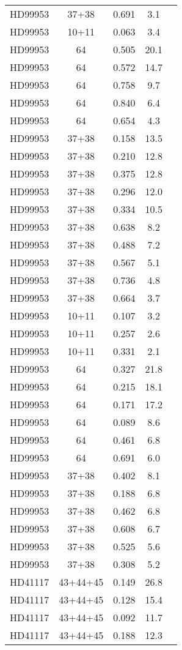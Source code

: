 \begin{table*}
\begin{tabular}{l c c c c}
HD99953 & 37+38 & 0.691 & 3.1\\ 
HD99953 & 10+11 & 0.063 & 3.4\\ 
HD99953 & 64 & 0.505 & 20.1\\ 
HD99953 & 64 & 0.572 & 14.7\\ 
HD99953 & 64 & 0.758 & 9.7\\ 
HD99953 & 64 & 0.840 & 6.4\\ 
HD99953 & 64 & 0.654 & 4.3\\ 
HD99953 & 37+38 & 0.158 & 13.5\\ 
HD99953 & 37+38 & 0.210 & 12.8\\ 
HD99953 & 37+38 & 0.375 & 12.8\\ 
HD99953 & 37+38 & 0.296 & 12.0\\ 
HD99953 & 37+38 & 0.334 & 10.5\\ 
HD99953 & 37+38 & 0.638 & 8.2\\ 
HD99953 & 37+38 & 0.488 & 7.2\\ 
HD99953 & 37+38 & 0.567 & 5.1\\ 
HD99953 & 37+38 & 0.736 & 4.8\\ 
HD99953 & 37+38 & 0.664 & 3.7\\ 
HD99953 & 10+11 & 0.107 & 3.2\\ 
HD99953 & 10+11 & 0.257 & 2.6\\ 
HD99953 & 10+11 & 0.331 & 2.1\\ 
HD99953 & 64 & 0.327 & 21.8\\ 
HD99953 & 64 & 0.215 & 18.1\\ 
HD99953 & 64 & 0.171 & 17.2\\ 
HD99953 & 64 & 0.089 & 8.6\\ 
HD99953 & 64 & 0.461 & 6.8\\ 
HD99953 & 64 & 0.691 & 6.0\\ 
HD99953 & 37+38 & 0.402 & 8.1\\ 
HD99953 & 37+38 & 0.188 & 6.8\\ 
HD99953 & 37+38 & 0.462 & 6.8\\ 
HD99953 & 37+38 & 0.608 & 6.7\\ 
HD99953 & 37+38 & 0.525 & 5.6\\ 
HD99953 & 37+38 & 0.308 & 5.2\\ 
\hline
HD41117 & 43+44+45 & 0.149 & 26.8\\ 
HD41117 & 43+44+45 & 0.128 & 15.4\\ 
HD41117 & 43+44+45 & 0.092 & 11.7\\ 
HD41117 & 43+44+45 & 0.188 & 12.3\\ 

\end{tabular}
\end{table*}
